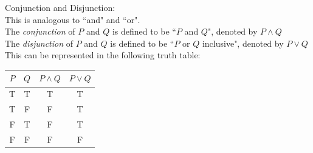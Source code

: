 \documentclass[11pt, fleqn]{article}
\begin{document}
Conjunction and Disjunction:\\
This is analogous to ``and" and ``or".\\
The \textit{conjunction} of $P$ and $Q$ is defined to be ``$P$ and $Q$", denoted by $P\wedge Q$\\
The \textit{disjunction} of $P$ and $Q$ is defined to be ``$P$ or $Q$ inclusive", denoted by $P\vee Q$\\
This can be represented in the following truth table:\\
\begin{tabular}{c|c|c|c}
    $P$ & $Q$ & $P\wedge Q$ & $P\vee Q$\\
    \hline
    T & T & T & T\\
    T & F & F & T\\
    F & T & F & T\\
    F & F & F & F
\end{tabular}\\
\end{document}
